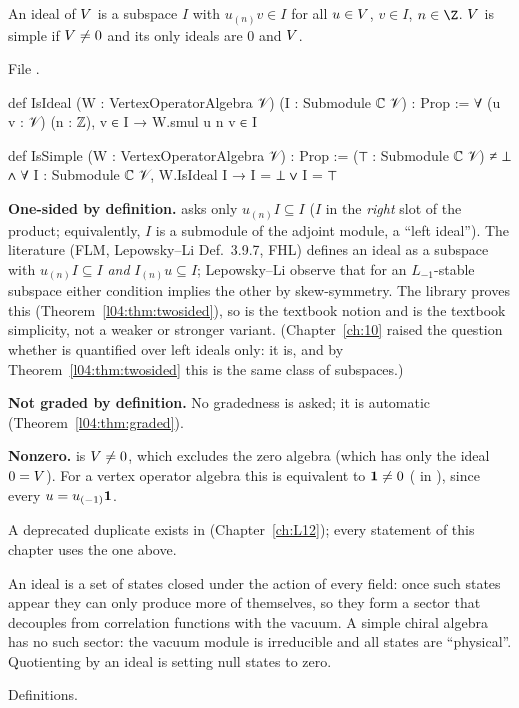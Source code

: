 \begin{definition}\label{l04:def:simple}
An ideal of $V$ is a subspace $I$ with $u_{(n)}v\in I$ for all $u\in V$, $v\in I$, $n\in\Z$.
$V$ is simple if $V\ne0$ and its only ideals are $0$ and $V$.
\end{definition}
\noindent File .
\begin{leancode}
def IsIdeal (W : VertexOperatorAlgebra 𝒱) (I : Submodule ℂ 𝒱) : Prop :=
  ∀ (u v : 𝒱) (n : ℤ), v ∈ I → W.smul u n v ∈ I

def IsSimple (W : VertexOperatorAlgebra 𝒱) : Prop :=
  (⊤ : Submodule ℂ 𝒱) ≠ ⊥ ∧ ∀ I : Submodule ℂ 𝒱, W.IsIdeal I → I = ⊥ ∨ I = ⊤
\end{leancode}
\begin{dictionary}
\textbf{One-sided by definition.}  asks only $u_{(n)}I\subseteq I$ ($I$ in the
\emph{right} slot of the product; equivalently, $I$ is a submodule of the adjoint module, a
``left ideal''). The literature (FLM, Lepowsky--Li Def.~3.9.7, FHL) defines an ideal as a subspace
with $u_{(n)}I\subseteq I$ \emph{and} $I_{(n)}u\subseteq I$; Lepowsky--Li observe that for
an $L_{-1}$-stable subspace either condition implies the other by skew-symmetry. The library proves
this (Theorem~\ref{l04:thm:twosided}), so  is the textbook notion and 
is the textbook simplicity, not a weaker or stronger variant. (Chapter~\ref{ch:10} raised the
question whether  is quantified over left ideals only: it is, and by
Theorem~\ref{l04:thm:twosided} this is the same class of subspaces.)

\textbf{Not graded by definition.} No gradedness is asked; it is automatic
(Theorem~\ref{l04:thm:graded}).

\textbf{Nonzero.}  is $V\ne0$, which excludes the zero
algebra (which has only the ideal $0 = V$). For a vertex operator algebra this is equivalent
to $\mathbf{1}\ne0$ (\allowbreak{}\allowbreak{}\allowbreak{} in ),
since every $u = u_{(-1)}\mathbf{1}$.

A deprecated duplicate  exists in 
(Chapter~\ref{ch:L12}); every statement of this chapter uses the one above.
\end{dictionary}
\begin{physics}
An ideal is a set of states closed under the action of every field: once such states appear they can
only produce more of themselves, so they form a sector that decouples from correlation functions with
the vacuum. A simple chiral algebra has no such sector: the vacuum module is irreducible and all
states are ``physical''. Quotienting by an ideal is setting null states to zero.
\end{physics}
\begin{status}
Definitions.
\end{status}

